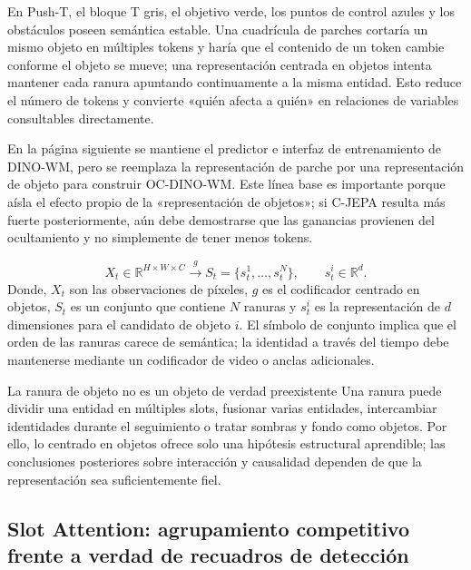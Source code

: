 En Push-T, el bloque T gris, el objetivo verde, los puntos de control azules y los obstáculos poseen semántica estable. Una cuadrícula de parches cortaría un mismo objeto en múltiples tokens y haría que el contenido de un token cambie conforme el objeto se mueve; una representación centrada en objetos intenta mantener cada ranura apuntando continuamente a la misma entidad. Esto reduce el número de tokens y convierte «quién afecta a quién» en relaciones de variables consultables directamente.


En la página siguiente se mantiene el predictor e interfaz de entrenamiento de DINO-WM, pero se reemplaza la representación de parche por una representación de objeto para construir OC-DINO-WM. Este línea base es importante porque aísla el efecto propio de la «representación de objetos»; si C-JEPA resulta más fuerte posteriormente, aún debe demostrarse que las ganancias provienen del ocultamiento y no simplemente de tener menos tokens.


\[
X_t\in\mathbb{R}^{H\times W\times C}
\xrightarrow{g}
S_t=\{s_t^1,\ldots,s_t^N\},
\qquad s_t^i\in\mathbb{R}^{d}.
\]
Donde, $X_t$ son las observaciones de píxeles, $g$ es el codificador centrado en objetos, $S_t$ es un conjunto que contiene $N$ ranuras y $s_t^i$ es la representación de $d$ dimensiones para el candidato de objeto $i$. El símbolo de conjunto implica que el orden de las ranuras carece de semántica; la identidad a través del tiempo debe mantenerse mediante un codificador de video o anclas adicionales.

\begin{warningbox}{La ranura de objeto no es un objeto de verdad preexistente}
Una ranura puede dividir una entidad en múltiples slots, fusionar varias entidades, intercambiar identidades durante el seguimiento o tratar sombras y fondo como objetos. Por ello, lo centrado en objetos ofrece solo una hipótesis estructural aprendible; las conclusiones posteriores sobre interacción y causalidad dependen de que la representación sea suficientemente fiel.
\end{warningbox}

\subsection{Slot Attention: agrupamiento competitivo frente a verdad de recuadros de detección}


